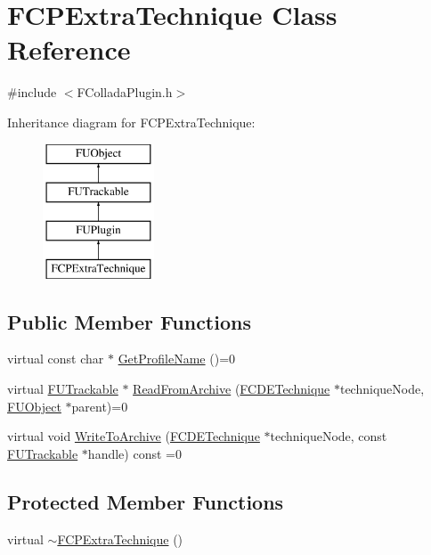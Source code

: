 \hypertarget{classFCPExtraTechnique}{
\section{FCPExtraTechnique Class Reference}
\label{classFCPExtraTechnique}
}


{\ttfamily \#include $<$FColladaPlugin.h$>$}

Inheritance diagram for FCPExtraTechnique:\begin{figure}[H]
\begin{center}
\leavevmode
\includegraphics[height=4.000000cm]{classFCPExtraTechnique}
\end{center}
\end{figure}
\subsection*{Public Member Functions}
\begin{DoxyCompactItemize}
\item 
virtual const char $\ast$ \hyperlink{classFCPExtraTechnique_a84327e2bfdd1244ff6d31f2bbb7ac842}{GetProfileName} ()=0
\item 
virtual \hyperlink{classFUTrackable}{FUTrackable} $\ast$ \hyperlink{classFCPExtraTechnique_ae01d2c7e85e81566f3816a5c9ebfde5c}{ReadFromArchive} (\hyperlink{classFCDETechnique}{FCDETechnique} $\ast$techniqueNode, \hyperlink{classFUObject}{FUObject} $\ast$parent)=0
\item 
virtual void \hyperlink{classFCPExtraTechnique_a38c358d4fb8f99b7081ad57d18428777}{WriteToArchive} (\hyperlink{classFCDETechnique}{FCDETechnique} $\ast$techniqueNode, const \hyperlink{classFUTrackable}{FUTrackable} $\ast$handle) const =0
\end{DoxyCompactItemize}
\subsection*{Protected Member Functions}
\begin{DoxyCompactItemize}
\item 
virtual \hyperlink{classFCPExtraTechnique_ab4672349b3775bce10c478607b94682c}{$\sim$FCPExtraTechnique} ()
\end{DoxyCompactItemize}


